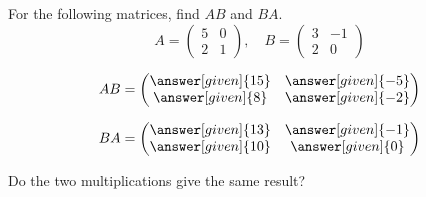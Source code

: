 \documentclass{ximera}
\begin{document}















\begin{question}
For the following matrices, find $AB$ and $BA$.
\[
A= \begin{pmatrix}
5 & 0 \\
2 & 1
\end{pmatrix}, \quad B =
\begin{pmatrix}
3 & -1 \\
2 & 0
\end{pmatrix}
\]
\begin{prompt}
\[
AB =\begin{pmatrix}
\answer[given]{15} & \answer[given]{-5}\\
\answer[given]{8} & \answer[given]{-2}
\end{pmatrix}
\]

\[
BA = \begin{pmatrix}
\answer[given]{13} & \answer[given]{-1}\\
\answer[given]{10} & \answer[given]{0}
\end{pmatrix}
\]
\end{prompt}
Do the two multiplications give the same result?
\begin{prompt}
  \begin{multipleChoice}
  \end{multipleChoice}
\end{prompt}
\end{question}
\end{document}
